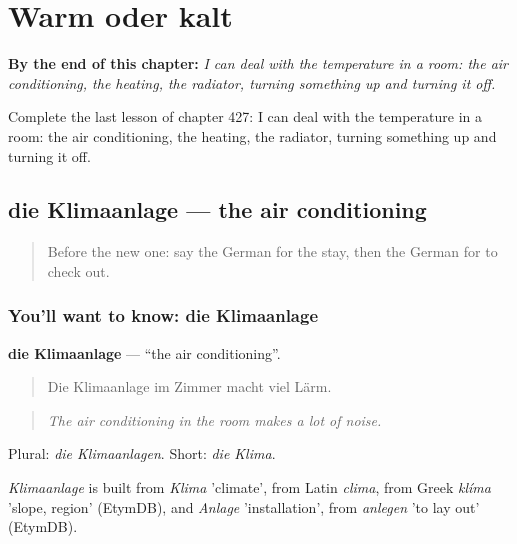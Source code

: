 
\chapter{Warm oder kalt}
\label{ch:ge-warm-oder-kalt}

\begin{chapteropening}
\textbf{By the end of this chapter:} \emph{I can deal with the temperature in a room: the air conditioning, the heating, the radiator, turning something up and turning it off.}

Complete the last lesson of chapter 427: I can deal with the temperature in a room: the air conditioning, the heating, the radiator, turning something up and turning it off.
\end{chapteropening}

\section[die Klimaanlage]{die Klimaanlage — the air conditioning}

\label{lesson:GE-C427-klimaanlage}



\begin{quote}
Before the new one: say the German for the stay, then the German for to check out.
\end{quote}

\subsection*{You'll want to know: die Klimaanlage}
\textbf{die Klimaanlage} — \textquotedblleft{}the air conditioning\textquotedblright{}.

\begin{quote}
Die Klimaanlage im Zimmer macht viel Lärm.
\end{quote}

\begin{quote}
\emph{The air conditioning in the room makes a lot of noise.}
\end{quote}

Plural: \emph{die Klimaanlagen}. Short: \emph{die Klima}.

\begin{cousinweb}
\emph{Klimaanlage} is built from \emph{Klima} 'climate', from Latin \emph{clima}, from Greek \emph{klíma} 'slope, region' (EtymDB), and \emph{Anlage} 'installation', from \emph{anlegen} 'to lay out' (EtymDB).
\end{cousinweb}


